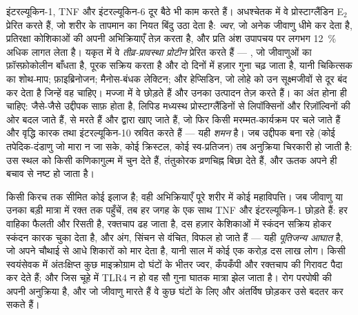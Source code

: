 \begin{proposition}[ज्वर, तीव्र प्रावस्था और शमन]\label{prop:b3:innate-immunity:systemic}
इंटरल्यूकिन-1, TNF और इंटरल्यूकिन-6 दूर बैठे भी काम करते हैं।
अधश्चेतक में वे प्रोस्टाग्लैंडिन E$_{2}$ प्रेरित करते हैं, जो शरीर के
तापमान का नियत बिंदु उठा देता है: \emph{ज्वर}, जो अनेक जीवाणु धीमे कर
देता है, प्रतिरक्षा कोशिकाओं की अपनी अभिक्रियाएँ तेज़ करता है, और प्रति
अंश उपापचय पर लगभग \qty{12}{\%} अधिक लागत लेता है। यकृत में वे
\emph{तीव्र-प्रावस्था प्रोटीन} प्रेरित करते हैं --- , जो जीवाणुओं का फ़ॉस्फ़ोकोलीन बाँधता है, पूरक सक्रिय करता है और
दो दिनों में हज़ार गुना चढ़ जाता है, यानी चिकित्सक का शोथ-माप;
फ़ाइब्रिनोजन; मैनोस-बंधक लेक्टिन; और हेप्सिडिन, जो लोहे को उन
सूक्ष्मजीवों से दूर बंद कर देता है जिन्हें वह चाहिए। मज्जा में वे
 छोड़ते हैं और उनका उत्पादन तेज़ करते हैं।  का अंत होना
ही चाहिए: जैसे-जैसे उद्दीपक साफ़ होता है, लिपिड मध्यस्थ
प्रोस्टाग्लैंडिनों से लिपॉक्सिनों और रिज़ॉल्विनों की ओर बदल जाते हैं,
  से मरते हैं और  द्वारा खाए जाते हैं,
जो फिर किसी मरम्मत-कार्यक्रम पर चले जाते हैं और वृद्धि कारक तथा
इंटरल्यूकिन-10 स्रवित करते हैं --- यही \emph{शमन} है। जब उद्दीपक बना
रहे (कोई तपेदिक-दंडाणु जो मारा न जा सके, कोई क्रिस्टल, कोई स्व-प्रतिजन)
तब अनुक्रिया चिरकारी हो जाती है:  उस स्थल को किसी कणिकागुल्म
में चुन देते हैं, तंतुकोरक व्रणचिह्न बिछा देते हैं, और ऊतक अपने ही बचाव
से नष्ट हो जाता है।
\end{proposition}

\begin{example}[पूतिता]\label{ex:b3:innate-immunity:sepsis}
किसी किरच तक सीमित  कोई इलाज है; वही अभिक्रियाएँ पूरे शरीर में कोई
महाविपत्ति। जब जीवाणु या उनका  बड़ी मात्रा में रक्त तक
पहुँचें, तब हर जगह के  एक साथ TNF और इंटरल्यूकिन-1 छोड़ते हैं:
हर वाहिका फैलती और रिसती है, रक्तचाप ढह जाता है, दस हज़ार केशिकाओं में
स्कंदन सक्रिय होकर स्कंदन कारक चुका देता है, और अंग, सिंचन से वंचित,
विफल हो जाते हैं --- यही \emph{पूतिजन्य आघात} है, जो अपने चौथाई से आधे
शिकारों को मार देता है, यानी साल में कोई एक करोड़ दस लाख लोग।
किसी स्वयंसेवक में अंतःक्षिप्त कुछ माइक्रोग्राम  दो
घंटों के भीतर ज्वर, कँपकँपी और रक्तचाप की गिरावट पैदा कर देते हैं; और
जिस चूहे में TLR4 न हो वह सौ गुना घातक मात्रा झेल जाता है। रोग परपोषी
की अपनी अनुक्रिया है, और जो  जीवाणु मारते हैं वे कुछ घंटों
के लिए और अंतर्विष छोड़कर उसे बदतर कर सकते हैं।
\end{example}

